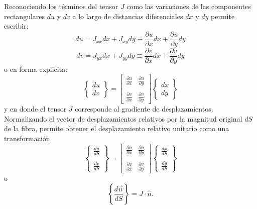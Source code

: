 \documentclass[../notas medios.tex]{subfiles}
\begin{document}
Reconociendo los términos del tensor $J$ como las variaciones de las componentes rectangulares $du$ y $dv$ a lo largo de distancias diferenciales $dx$ y $dy$ permite escribir:
\[du = {J_{xx}}dx + {J_{xy}}dy \equiv \frac{{\partial u}}{{\partial x}}dx + \frac{{\partial u}}{{\partial y}}dy\]
\[dv = {J_{yx}}dx + {J_{yy}}dy \equiv \frac{{\partial v}}{{\partial x}}dx + \frac{{\partial v}}{{\partial y}}dy\]
o en forma explicita:
\[\left\{ {\begin{array}{*{20}{c}}
{du}\\
{dv}
\end{array}} \right\} = \left[ {\begin{array}{*{20}{c}}
{\frac{{\partial u}}{{\partial x}}}&{\frac{{\partial u}}{{\partial y}}}\\\\
{\frac{{\partial v}}{{\partial x}}}&{\frac{{\partial v}}{{\partial y}}}
\end{array}} \right]\left\{ {\begin{array}{*{20}{c}}
{dx}\\
{dy}
\end{array}} \right\}\]
y en donde el tensor $J$ corresponde al gradiente de desplazamientos. Normalizando el vector de desplazamientos relativos por la magnitud original $dS$ de la fibra, permite obtener el desplazamiento relativo unitario como una transformación
\[\left\{ {\begin{array}{*{20}{c}}
{\frac{{du}}{{dS}}}\\\\
{\frac{{dv}}{{dS}}}
\end{array}} \right\} = \left[ {\begin{array}{*{20}{c}}
{\frac{{\partial u}}{{\partial x}}}&{\frac{{\partial u}}{{\partial y}}}\\\\
{\frac{{\partial v}}{{\partial x}}}&{\frac{{\partial v}}{{\partial y}}}
\end{array}} \right]\left\{ {\begin{array}{*{20}{c}}
{\frac{{dx}}{{dS}}}\\\\
{\frac{{dy}}{{dS}}}
\end{array}} \right\}\]
o
\begin{equation}
\left\{ {\frac{{d\vec u}}{{dS}}} \right\} = J \cdot \hat n.
\label{trans}
\end{equation}
\end{document}
